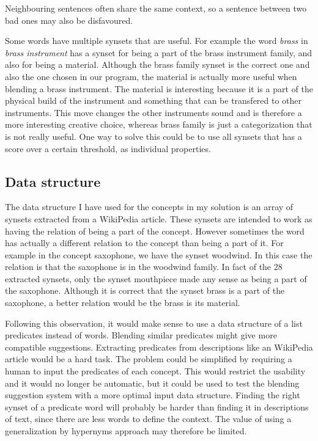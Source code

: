 Neighbouring sentences often share the same context, so a sentence between two bad ones may also be disfavoured.

Some words have multiple synsets that are useful. For example the word \emph{brass} in \emph{brass instrument} has a synset for being a part of the brass instrument family, and also for being a material. Although the brass family synset is the correct one and also the one chosen in our program, the material is actually more useful when blending a brass instrument. The material is interesting because it is a part of the physical build of the instrument and something that can be transfered to other instruments. This move changes the other instruments sound and is therefore a more interesting creative choice, whereas brass family is just a categorization that is not really useful. One way to solve this could be to use all synsets that has a score over a certain threshold, as individual properties.


\subsection{Data structure}
The data structure I have used for the concepts in my solution is an array of synsets extracted from a WikiPedia article. These synsets are intended to work as having the relation of being a part of the concept. However sometimes the word has actually a different relation to the concept than being a part of it. For example in the concept saxophone, we have the synset woodwind. In this case the relation is that the saxophone is in the woodwind family. In fact of the 28 extracted synsets, only the synset mouthpiece made any sense as being a part of the saxophone. Although it is correct that the synset brass is a part of the saxophone, a better relation would be the brass is its material.

Following this observation, it would make sense to use a data structure of a list predicates instead of words. Blending similar predicates might give more compatible suggestions. Extracting predicates from descriptions like an WikiPedia article would be a hard task. The problem could be simplified by requiring a human to input the predicates of each concept. This would restrict the usability and it would no longer be automatic, but it could be used to test the blending suggestion system with a more optimal input data structure. Finding the right synset of a predicate word will probably be harder than finding it in descriptions of text, since there are less words to define the context. The value of using a generalization by hypernyms approach may therefore be limited.

